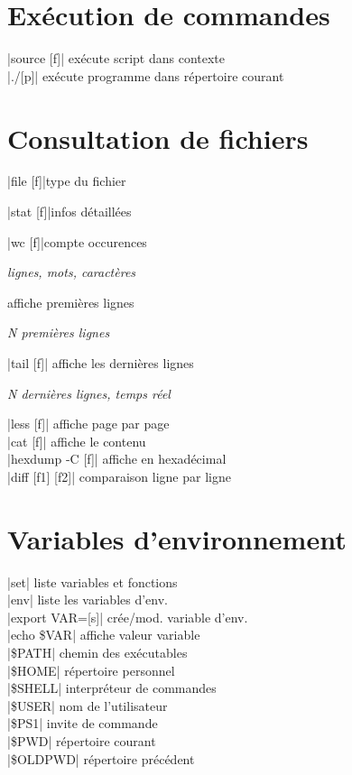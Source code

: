\documentclass[9pt]{extarticle}
\newcommand{\lstcode}[1]{\inlinecode{\detokenize{#1}}}
\newenvironment{cmdblock}{%
  \par\setlength{\parindent}{0pt}\setlength{\parskip}{0pt}%
  \RaggedRight%
}{\par}
\newlength{\cmdoptindent}
\newcommand{\cmdopt}[1]{%
  \hspace*{\cmdoptindent}%
  \begin{minipage}[t]{\dimexpr\linewidth-\cmdoptindent\relax}
    \RaggedRight \itshape #1%
  \end{minipage}\par
}
\begin{document}
\begin{multicols}{4}
\section*{Exécution de commandes}
\begin{cmdblock}
\code|source [f]| \quad exécute script dans contexte \\
\code|./[p]| \quad exécute programme dans répertoire courant \\
\end{cmdblock}

\section*{Consultation de fichiers}

\begin{cmdblock}
\code|file [f]|\quad type du fichier\par
\code|stat [f]|\quad infos détaillées\par
\code|wc [f]|\quad compte occurences\par
\cmdopt{\lstcode{-l} lignes, \lstcode{-w} mots, \lstcode{-c} caractères}
\quad affiche premières lignes\par
\cmdopt{\lstcode{-n N} N premières lignes}
\code|tail [f]| \quad affiche les dernières lignes \\
\cmdopt{\lstcode{-n N} N dernières lignes,
        \lstcode{-f} temps réel}
\code|less [f]| \quad affiche page par page \\
\code|cat [f]| \quad affiche le contenu \\
\code|hexdump -C [f]| \quad affiche en hexadécimal \\
\code|diff [f1] [f2]| \quad comparaison ligne par ligne \\
\end{cmdblock}

\section*{Variables d'environnement}
\begin{cmdblock}
\code|set| \quad liste variables et fonctions \\
\code|env| \quad liste les variables d'env. \\
\code|export VAR=[s]| \quad crée/mod. variable d'env. \\
\code|echo \$VAR| \quad affiche valeur variable \\
\code|\$PATH| \quad chemin des exécutables \\
\code|\$HOME| \quad répertoire personnel \\
\code|\$SHELL| \quad interpréteur de commandes \\
\code|\$USER| \quad nom de l'utilisateur \\
\code|\$PS1| \quad invite de commande \\
\code|\$PWD| \quad répertoire courant \\
\code|\$OLDPWD| \quad répertoire précédent \\
\end{cmdblock}


\end{multicols}
\end{document}
